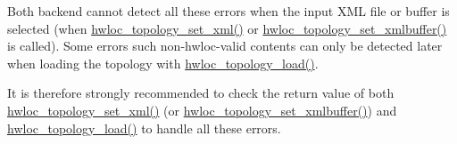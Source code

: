 Both backend cannot detect all these errors when the input XML file or buffer is selected (when \hyperlink{a00044_ga93efcc8a962afe1ed23393700682173f}{hwloc\_\-topology\_\-set\_\-xml()} or \hyperlink{a00044_gae7e4bade144652a2b48f5eaf0309b4ec}{hwloc\_\-topology\_\-set\_\-xmlbuffer()} is called). Some errors such non-\/hwloc-\/valid contents can only be detected later when loading the topology with \hyperlink{a00043_ga91e2e6427b95fb7339c99dbbef996e71}{hwloc\_\-topology\_\-load()}.

It is therefore strongly recommended to check the return value of both \hyperlink{a00044_ga93efcc8a962afe1ed23393700682173f}{hwloc\_\-topology\_\-set\_\-xml()} (or \hyperlink{a00044_gae7e4bade144652a2b48f5eaf0309b4ec}{hwloc\_\-topology\_\-set\_\-xmlbuffer()}) and \hyperlink{a00043_ga91e2e6427b95fb7339c99dbbef996e71}{hwloc\_\-topology\_\-load()} to handle all these errors. 